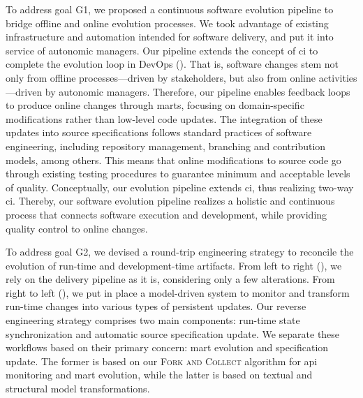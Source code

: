 \begin{description}[style=unboxed,leftmargin=0cm,font=\bfseries\normalsize]
	\item[\textsc{C}1: Continuous Software Evolution Pipeline\autodot]

	To address goal \textsc{G}1, we proposed a continuous software evolution pipeline to bridge offline and online evolution processes. We took advantage of existing infrastructure and automation intended for software delivery, and put it into service of autonomic managers. Our pipeline extends the concept of \gls{ci} to complete the evolution loop in DevOps  (). That is, software changes stem not only from offline processes---driven by stakeholders, but also from online activities---driven by autonomic managers. Therefore, our pipeline enables feedback loops to produce online changes through \glspl{mart}, focusing on domain-specific modifications rather than low-level code updates. The integration of these updates into source specifications follows standard practices of software engineering, including repository management, branching and contribution models, among others. This means that online modifications to source code go through existing testing procedures to guarantee minimum and acceptable levels of quality. Conceptually, our evolution pipeline extends \gls{ci}, thus realizing two-way \gls{ci}. Thereby, our software evolution pipeline realizes a holistic and continuous process that connects software execution and development, while providing quality control to online changes.

	To address goal \textsc{G}2, we devised a round-trip engineering strategy to reconcile the evolution of run-time and development-time artifacts. From left to right (), we rely on the delivery pipeline as it is, considering only a few alterations. From right to left (), we put in place a model-driven system to monitor and transform run-time changes into various types of persistent updates. Our reverse engineering strategy comprises two main components: run-time state synchronization and automatic source specification update. We separate these workflows based on their primary concern: \gls{mart} evolution and specification update. The former is based on our \textsc{Fork and Collect} algorithm for \gls{api} monitoring and \gls{mart} evolution, while the latter is based on textual and structural model transformations.


\end{description}
